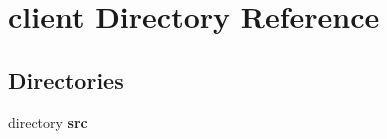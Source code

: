 \section{client Directory Reference}
\label{dir_db3a54907829b36871118d03417739cd}
\subsection*{Directories}
\begin{DoxyCompactItemize}
\item 
directory {\bf src}
\end{DoxyCompactItemize}
